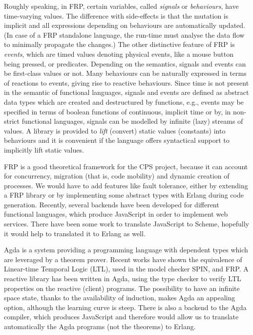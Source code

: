 \documentclass[a4paper,11pt,twoside]{article}
\newcommand\SPIN{\textsf{SPIN}\xspace}
\newcommand\Erlang{\textsf{Erlang}\xspace}
\newcommand\Agda{\textsf{Agda}\xspace}
\newcommand\JavaScript{\textsf{JavaScript}\xspace}
\newcommand\Scheme{\textsf{Scheme}\xspace}
\begin{document}
Roughly speaking, in FRP, certain variables, called \emph{signals} or
\emph{behaviours}, have time\hyp{}varying values. The difference with
side\hyp{}effects is that the mutation is implicit and all expressions
depending on behaviours are automatically updated. (In case of a FRP
standalone language, the run\hyp{}time must analyse the data flow to
minimally propagate the changes.) The other distinctive feature of FRP
is \emph{events}, which are timed values denoting physical events,
like a mouse button being pressed, or predicates. Depending on the
semantics, signals and events can be first\hyp{}class values or
not. Many behaviours can be naturally expressed in terms of reactions
to events, giving rise to reactive behaviours. Since time is not
present in the semantic of functional languages, signals and events
are defined as abstract data types which are created and destructured
by functions, e.g., events may be specified in terms of boolean
functions of continuous, implicit time or by, in non\hyp{}strict
functional languages, signals can be modelled by infinite (lazy)
streams of values. A library is provided to \emph{lift} (convert)
static values (constants) into behaviours and it is convenient if the
language offers syntactical support to implicitly lift static values.

FRP is a good theoretical framework for the CPS project, because it
can account for concurrency, migration (that is, code mobility) and
dynamic creation of processes. We would have to add features like
fault tolerance, either by extending a FRP library or by implementing
some abstract types with \Erlang during code generation. Recently,
several backends have been developed for different functional
languages, which produce \JavaScript in order to implement web
services. There have been some work to translate \JavaScript to
\Scheme, hopefully it would help to translated it to \Erlang as well.

\Agda is a system providing a programming language with dependent
types which are leveraged by a theorem prover. Recent works have shown
the equivalence of Linear-time Temporal Logic (LTL), used in the model
checker \SPIN, and FRP. A reactive library has been written in \Agda,
using the type checker to verify LTL properties on the reactive
(client) programs. The possibility to have an infinite space state,
thanks to the availability of induction, makes \Agda an appealing
option, although the learning curve is steep. There is also a backend
to the \Agda compiler, which produces \JavaScript and therefore would
allow us to translate automatically the \Agda programs (not the
theorems) to \Erlang.

%
%
\printbibliography
\nocite{*}
\end{document}
